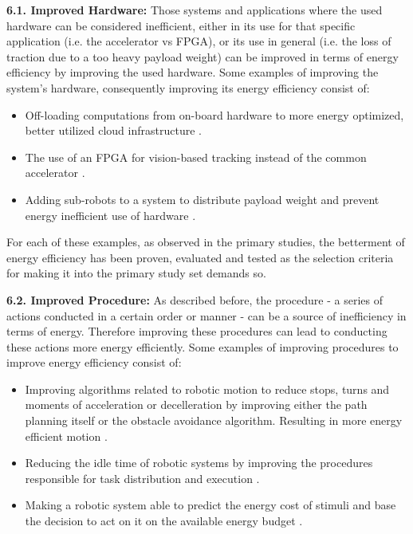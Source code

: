 \vspace{2mm} \noindent \textbf{6.1. Improved Hardware:}
Those systems and applications where the used hardware can be considered inefficient, 
either in its use for that specific application (i.e. the accelerator vs FPGA),
or its use in general (i.e. the loss of traction due to a too heavy payload weight)
can be improved in terms of energy efficiency by improving the used hardware.
Some examples of improving the system's hardware, consequently improving its energy efficiency consist of:
\begin{itemize}
    \item Off-loading computations from on-board hardware to more energy optimized, better utilized cloud infrastructure \cite{rahman2019cloud_robot_offloading}.
    \item The use of an FPGA for vision-based tracking instead of the common accelerator \cite{cheng2018FPGA_image_recognition}.
    \item Adding sub-robots to a system to distribute payload weight and prevent energy inefficient use of hardware \cite{kim2016firefighting_robot}.
\end{itemize}

For each of these examples, as observed in the primary studies, the betterment of energy efficiency has been proven, evaluated and tested
as the selection criteria for making it into the primary study set demands so.

\vspace{2mm} \noindent \textbf{6.2. Improved Procedure:}
As described before, the procedure - a series of actions conducted in a certain order or manner - can be a source of inefficiency in terms of energy.
Therefore improving these procedures can lead to conducting these actions more energy efficiently.
Some examples of improving procedures to improve energy efficiency consist of:
\begin{itemize}
    \item Improving algorithms related to robotic motion to reduce stops, turns and moments of acceleration or decelleration by improving either the path planning itself
    or the obstacle avoidance algorithm. Resulting in more energy efficient motion 
    \cite{xie2018mecanum_wheel,mei2006mobile_exploration, mei2005energy_consumers_identified, barili1995efficient_motion, jia2004grid_strategy_exploration, kaitwanidvilai2020industrial_robot_cycle_time}.
    \item Reducing the idle time of robotic systems by improving the procedures responsible for task distribution and execution 
    \cite{kaitwanidvilai2020industrial_robot_cycle_time, gurel2019industrial_robot_scheduling, wingstrom2013robot_cell_scheduling}.
    \item Making a robotic system able to predict the energy cost of stimuli and base the decision to act on it on the available energy budget \cite{kirtay2013humanoid_emotion}.
\end{itemize}


